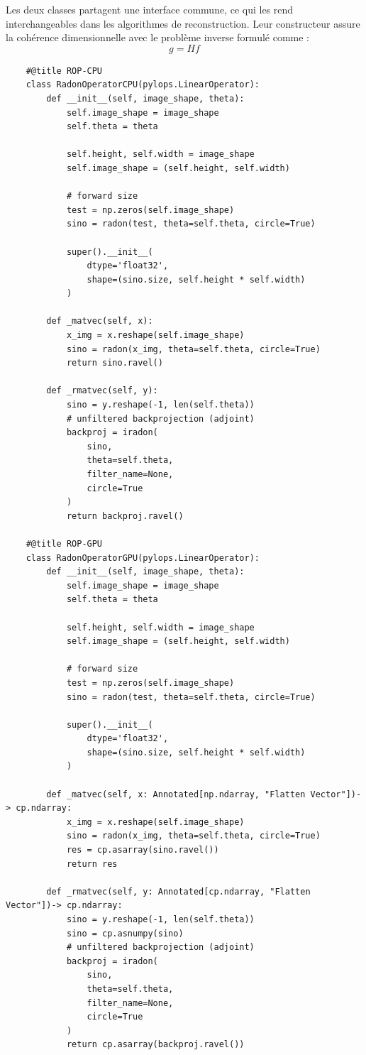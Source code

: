 Les deux classes partagent une interface commune, ce qui les rend interchangeables dans les algorithmes de reconstruction. Leur constructeur assure la cohérence dimensionnelle avec le problème inverse formulé comme :
\[
g = Hf
\]
\begin{verbatim}
    #@title ROP-CPU
    class RadonOperatorCPU(pylops.LinearOperator):
        def __init__(self, image_shape, theta):
            self.image_shape = image_shape
            self.theta = theta

            self.height, self.width = image_shape
            self.image_shape = (self.height, self.width)

            # forward size
            test = np.zeros(self.image_shape)
            sino = radon(test, theta=self.theta, circle=True)

            super().__init__(
                dtype='float32',
                shape=(sino.size, self.height * self.width)
            )

        def _matvec(self, x):
            x_img = x.reshape(self.image_shape)
            sino = radon(x_img, theta=self.theta, circle=True)
            return sino.ravel()

        def _rmatvec(self, y):
            sino = y.reshape(-1, len(self.theta))
            # unfiltered backprojection (adjoint)
            backproj = iradon(
                sino,
                theta=self.theta,
                filter_name=None,
                circle=True
            )
            return backproj.ravel()

    #@title ROP-GPU
    class RadonOperatorGPU(pylops.LinearOperator):
        def __init__(self, image_shape, theta):
            self.image_shape = image_shape
            self.theta = theta

            self.height, self.width = image_shape
            self.image_shape = (self.height, self.width)

            # forward size
            test = np.zeros(self.image_shape)
            sino = radon(test, theta=self.theta, circle=True)

            super().__init__(
                dtype='float32',
                shape=(sino.size, self.height * self.width)
            )

        def _matvec(self, x: Annotated[np.ndarray, "Flatten Vector"])-> cp.ndarray:
            x_img = x.reshape(self.image_shape)
            sino = radon(x_img, theta=self.theta, circle=True)
            res = cp.asarray(sino.ravel())
            return res

        def _rmatvec(self, y: Annotated[cp.ndarray, "Flatten Vector"])-> cp.ndarray:
            sino = y.reshape(-1, len(self.theta))
            sino = cp.asnumpy(sino)
            # unfiltered backprojection (adjoint)
            backproj = iradon(
                sino,
                theta=self.theta,
                filter_name=None,
                circle=True
            )
            return cp.asarray(backproj.ravel())

\end{verbatim}

